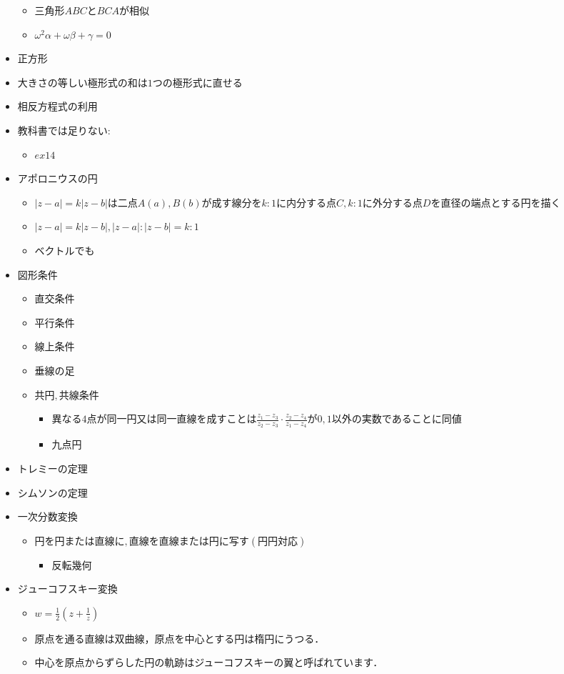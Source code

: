 \documentclass[dvipdfmx,uplatex]{jsarticle}
\begin{document}
\begin{itemize}
	\begin{itemize}
		\item $ 三角形ABCとBCAが相似$
		\item $ ω^2α+ωβ+γ=0$
	\end{itemize}
	\item $ 正方形$
	\item $ 大きさの等しい極形式の和は1つの極形式に直せる$
	\item $ 相反方程式の利用$
	\item $ 教科書では足りない:$
	\begin{itemize}
		\item $ ex14$
	\end{itemize}
	\item $ アポロニウスの円$
	\begin{itemize}
		\item $ |z-a| = k |z-b| は二点A(a),B(b)が成す線分をk:1に内分する点C,k:1に外分する点Dを直径の端点とする円を描く$
		\item $  |z-a| = k |z-b| , |z-a| : |z-b| = k : 1$
		\item ベクトルでも
	\end{itemize}
	\item $ 図形条件$
	\begin{itemize}
		\item $ 直交条件$
		\item $ 平行条件$
		\item $ 線上条件$
		\item $ 垂線の足$
		\item $ 共円,共線条件$
		\begin{itemize}
			\item $ 異なる4点が同一円又は同一直線を成すことは \frac{z_1-z_3}{z_2-z_3} \cdot \frac{z_2-z_4}{z_1-z_4}が0,1以外の実数であることに同値$
			\item $ 九点円$
		\end{itemize}
	\end{itemize}
	\item $ トレミーの定理$
	\item $ シムソンの定理$
	\item $ 一次分数変換$
	\begin{itemize}
		\item $ 円を円または直線に,直線を直線または円に写す(円円対応)$
		\begin{itemize}
			\item $ 反転幾何$
		\end{itemize}
	\end{itemize}
	\item $ ジューコフスキー変換$
	\begin{itemize}
		\item $ w = \frac{1}{2} \left( z + \frac{1}{z} \right)$
		\item 原点を通る直線は双曲線，原点を中心とする円は楕円にうつる．
		\item 中心を原点からずらした円の軌跡はジューコフスキーの翼と呼ばれています．
	\end{itemize}
\end{itemize}
\end{document}
